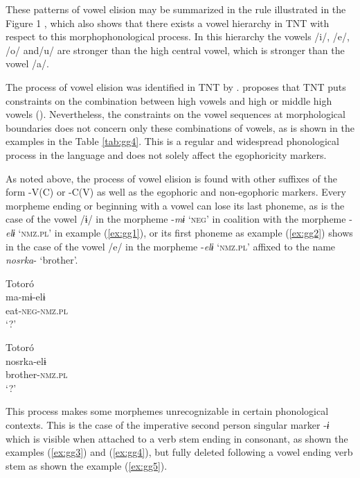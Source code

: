 \documentclass[output=paper]{langsci/langscibook}
\begin{document}
These patterns of vowel elision may be summarized in the rule illustrated in the Figure 1%
, which also shows that there exists a vowel hierarchy in TNT with respect to this morphophonological process. In this hierarchy the vowels /i/, /e/, /o/ and/u/ are stronger than the high central vowel, which is stronger than the vowel /a/.



The process of vowel elision was identified in TNT by \citet{Pabon1989}. \citeauthor{Pabon1989} proposes that TNT puts constraints on the combination between high vowels and high or middle high vowels (\citeyear[16]{Pabon1989}). Nevertheless, the constraints on the vowel sequences at morphological boundaries does not concern only these combinations of vowels, as is shown in the examples in the Table \ref{tab:gg4}. This is a regular and widespread phonological process in the language and does not solely affect the egophoricity markers. 

As noted above, the process of vowel elision is found with other suffixes of the form -V(C) or -C(V) as well as the egophoric and non-egophoric markers. Every morpheme ending or beginning with a vowel can lose its last phoneme, as is the case of the vowel /ɨ/ in the morpheme -\textit{mɨ} ‘\textsc{neg}’ in coalition with the morpheme -\textit{elɨ} ‘\textsc{nmz.pl}’ in example (\ref{ex:gg1}), or its first phoneme as example (\ref{ex:gg2}) shows in the case of the vowel /e/ in the morpheme -\textit{elɨ} ‘\textsc{nmz.pl}’ affixed to the name \textit{nosrka}- ‘brother’.

\ea Totoró\label{ex:gg1}\\
	\gll ma-mɨ-elɨ \\
      eat-\textsc{neg-nmz.pl}\\
	\glt ‘?’ %
	\z

\ea Totoró\label{ex:gg2}\\
	\gll nosrka-elɨ \\
      brother-\textsc{nmz.pl}\\
	\glt ‘?’ %
	\z
	
This process makes some morphemes unrecognizable in certain phonological contexts. This is the case of the imperative second person singular marker -\textit{ɨ} which is visible when attached to a verb stem ending in consonant, as shown the examples (\ref{ex:gg3}) and (\ref{ex:gg4}), but fully deleted following a vowel ending verb stem as shown the example (\ref{ex:gg5}).
\end{document}
